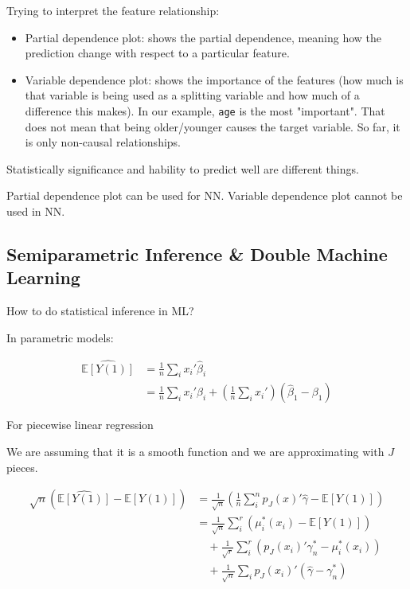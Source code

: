 \documentclass{article}
\begin{document}
Trying to interpret the feature relationship:
\begin{itemize}
    \item Partial dependence plot: shows the partial dependence, meaning how the prediction change with respect to a particular feature.
    \item Variable dependence plot: shows the importance of the features (how much is that variable is being used as a splitting variable and how much of a difference this makes). In our example, \texttt{age} is the most "important". That does not mean that being older/younger causes the target variable. So far, it is only non-causal relationships.
\end{itemize}

Statistically significance and hability to predict well are different things.

Partial dependence plot can be used for NN. Variable dependence plot cannot be used in NN.

\subsection{Semiparametric Inference \& Double Machine Learning}

How to do statistical inference in ML?

In parametric models:

\begin{align*}
    \hat{\mathbb{E}[Y(1)]} &= \frac{1}{n} \sum_i x_i' \hat{\beta}_i \\
    &= \frac{1}{n} \sum_i x_i' \beta_i
        + \left(\frac{1}{n} \sum_i x_i'\right) \left( \hat{\beta}_1 - \beta_1 \right)
\end{align*}

For piecewise linear regression

We are assuming that it is a smooth function and we are approximating with $J$ pieces.

\begin{align*}
    \sqrt{n} \left( \hat{\mathbb{E}[Y(1)]} - \mathbb{E}[Y(1)] \right)
    &= \frac{1}{\sqrt{n}}
    \left(
        \frac{1}{n} \sum_i^n p_J(x)' \hat{\gamma} - \mathbb{E}[Y(1)]
    \right) \\
    &= \frac{1}{\sqrt{n}}
    \sum_i^r (\mu_i^{*}(x_i) - \mathbb{E}[Y(1)]) \\
    &\quad + \frac{1}{\sqrt{r}}
    \sum_i^r (p_J (x_i)' \gamma_n^{*} - \mu_i^{*}(x_i)) \\
    &\quad + \frac{1}{\sqrt{n}}
    \sum_i p_J (x_i)' (\hat{\gamma} - \gamma_n^{*}) 
\end{align*}
\end{document}
